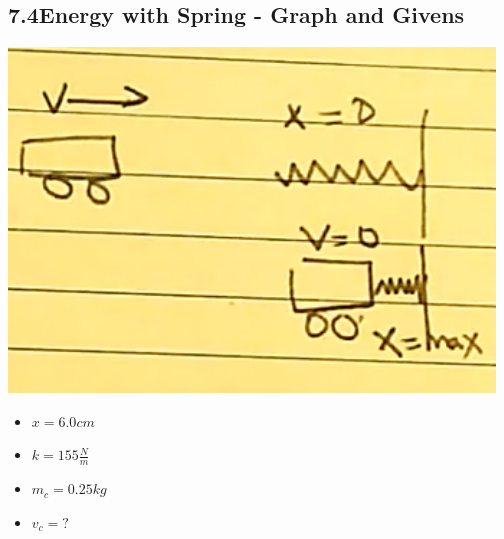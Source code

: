 \documentclass{article}
\begin{document}
\begin{adjustwidth}{1cm}{0pt}
    \subsection*{7.4\hspace*{0.5cm}Energy with Spring - Graph and Givens}
    \begin{minipage}{0.5\textwidth}
        \includegraphics[scale=0.33]{./images/springs.png}
    \end{minipage}
    \begin{minipage}{0.5\textwidth}
        \begin{itemize}
            \item $x = 6.0cm$
            \item $k = 155\frac{N}{m}$
            \item $m_{c} = 0.25kg$
            \item $v_{c} = ?$
        \end{itemize}
    \end{minipage}

\end{adjustwidth}
\end{document}
